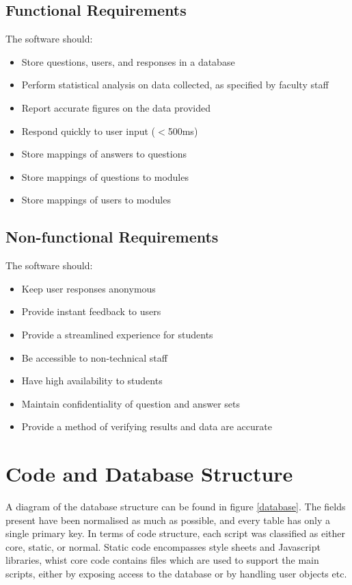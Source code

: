 \documentclass[12pt,a4paper,twoside]{report}
\begin{document}
\subsection{Functional Requirements}
The software should:
\begin{itemize}
	\item Store questions, users, and responses in a database
	\item Perform statistical analysis on data collected, as specified by faculty staff
	\item Report accurate figures on the data provided
	\item Respond quickly to user input ($<$500ms)
	\item Store mappings of answers to questions
	\item Store mappings of questions to modules
	\item Store mappings of users to modules
\end{itemize}
\subsection{Non-functional Requirements}
The software should:
\begin{itemize}
	\item Keep user responses anonymous
	\item Provide instant feedback to users
	\item Provide a streamlined experience for students
	\item Be accessible to non-technical staff
	\item Have high availability to students
	\item Maintain confidentiality of question and answer sets
	\item Provide a method of verifying results and data are accurate
\end{itemize}

\section{Code and Database Structure}
A diagram of the database structure can be found in figure \ref{database}. The fields present have been normalised as much as possible, and every table has only a single primary key. In terms of code structure, each script was classified as either core, static, or normal. Static code encompasses style sheets and Javascript libraries, whist core code contains files which are used to support the main scripts, either by exposing access to the database or by handling user objects etc. 
\end{document}
